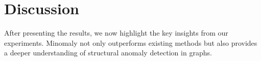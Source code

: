 \documentclass[pdflatex,sn-mathphys-num]{sn-jnl}%
\theoremstyle{thmstyleone}%
\theoremstyle{thmstyletwo}%
\theoremstyle{thmstylethree}%
\begin{document}

\section{Discussion}
\label{sec:discussion}

After presenting the results, we now highlight the key insights from our experiments. Minomaly not only outperforms existing methods but also provides a deeper understanding of structural anomaly detection in graphs.
\end{document}
